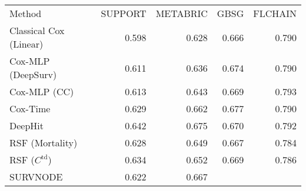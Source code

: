  \begin{tabular}{lrrrr}
        Method &         SUPPORT &        METABRIC &    GBSG &         FLCHAIN \\
        Classical Cox (Linear)       &           0.598 &           0.628 &           0.666 &           0.790 \\
        Cox-MLP (DeepSurv) &           0.611 &           0.636 &           0.674 &           0.790 \\
        Cox-MLP (CC)       &           0.613 &           0.643 &           0.669 &  0.793 \\
        Cox-Time           &           0.629 &           0.662 & 0.677 &           0.790 \\
        DeepHit            &           0.642 &  0.675 &           0.670 &           0.792 \\
        RSF (Mortality)    &           0.628 &           0.649 &           0.667 &           0.784 \\
        RSF ($C^\text{td}$)          &           0.634 &           0.652 &           0.669 &           0.786 \\
        SURVNODE &  0.622 &0.667 & & \\
\end{tabular}